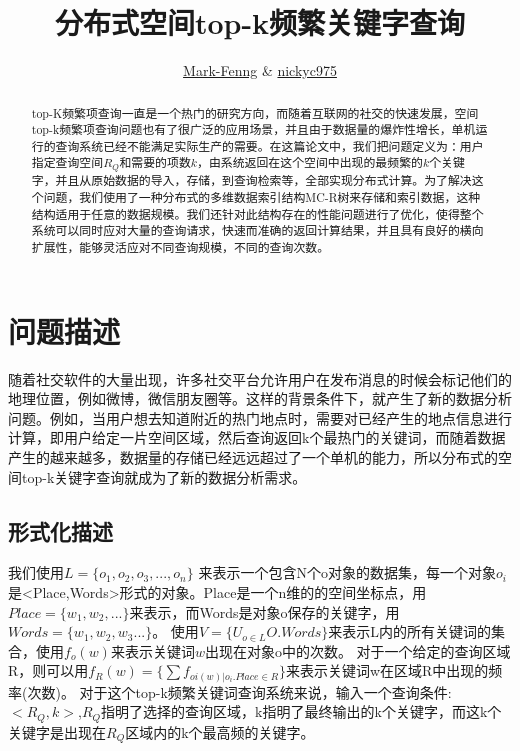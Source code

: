 \documentclass{elegantpaper}
\title{分布式空间top-k频繁关键字查询}
\author{
    \href{https://github.com/Mark-Fenng}{Mark-Fenng} \& \href{https://github.com/nickyc975}{nickyc975}
}
\begin{document}
\maketitle

\begin{abstract}
    top-K频繁项查询一直是一个热门的研究方向，而随着互联网的社交的快速发展，空间top-k频繁项查询问题也有了很广泛的应用场景，并且由于数据量的爆炸性增长，单机运行的查询系统已经不能满足实际生产的需要。在这篇论文中，我们把问题定义为：用户指定查询空间$R_Q$和需要的项数$k$，由系统返回在这个空间中出现的最频繁的$k$个关键字，并且从原始数据的导入，存储，到查询检索等，全部实现分布式计算。为了解决这个问题，我们使用了一种分布式的多维数据索引结构MC-R树来存储和索引数据，这种结构适用于任意的数据规模。我们还针对此结构存在的性能问题进行了优化，使得整个系统可以同时应对大量的查询请求，快速而准确的返回计算结果，并且具有良好的横向扩展性，能够灵活应对不同查询规模，不同的查询次数。
\end{abstract}

\section{问题描述}

随着社交软件的大量出现，许多社交平台允许用户在发布消息的时候会标记他们的地理位置，例如微博，微信朋友圈等。这样的背景条件下，就产生了新的数据分析问题。例如，当用户想去知道附近的热门地点时，需要对已经产生的地点信息进行计算，即用户给定一片空间区域，然后查询返回k个最热门的关键词，而随着数据产生的越来越多，数据量的存储已经远远超过了一个单机的能力，所以分布式的空间top-k关键字查询就成为了新的数据分析需求。

\subsection{形式化描述}
我们使用$L=\{o_1,o_2,o_3,...,o_n\} $ 来表示一个包含N个o对象的数据集，每一个对象$o_i$是<Place,Words>形式的对象。Place是一个n维的的空间坐标点，用$Place=\{w_1,w_2,...\}$来表示，而Words是对象o保存的关键字，用$Words=\{w_1,w_2,w_3... \}$。\newline
使用$V=\{U_{o\in L}O.Words\}$来表示L内的所有关键词的集合，使用$f_o(w)$来表示关键词$w$出现在对象o中的次数。\newline
对于一个给定的查询区域R，则可以用$f_R(w)=\{\sum{f_{oi(w)|o_i.Place\in R}} \}$来表示关键词w在区域R中出现的频率(次数)。\newline
对于这个top-k频繁关键词查询系统来说，输入一个查询条件:$<R_Q,k>$,$R_Q$指明了选择的查询区域，k指明了最终输出的k个关键字，而这k个关键字是出现在$R_Q$区域内的k个最高频的关键字。\newline
\end{document}
